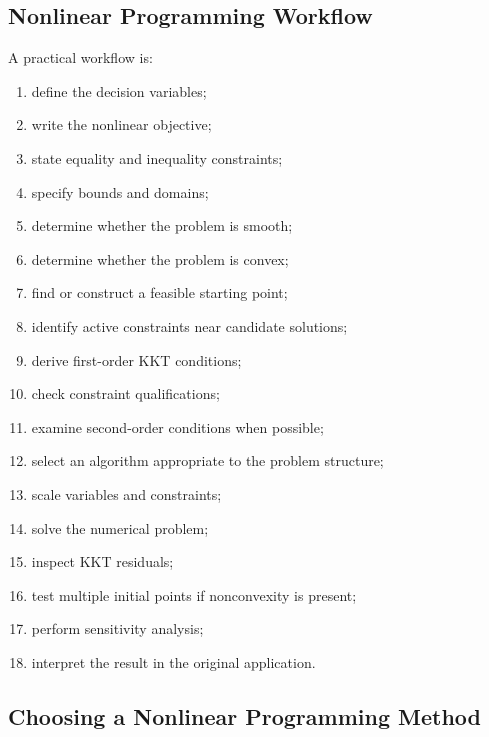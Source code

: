 \subsection{Nonlinear Programming Workflow}
\label{subsec:nlp-workflow}

A practical workflow is:

\begin{enumerate}
    \item define the decision variables;
    \item write the nonlinear objective;
    \item state equality and inequality constraints;
    \item specify bounds and domains;
    \item determine whether the problem is smooth;
    \item determine whether the problem is convex;
    \item find or construct a feasible starting point;
    \item identify active constraints near candidate solutions;
    \item derive first-order KKT conditions;
    \item check constraint qualifications;
    \item examine second-order conditions when possible;
    \item select an algorithm appropriate to the problem structure;
    \item scale variables and constraints;
    \item solve the numerical problem;
    \item inspect KKT residuals;
    \item test multiple initial points if nonconvexity is present;
    \item perform sensitivity analysis;
    \item interpret the result in the original application.
\end{enumerate}

\subsection{Choosing a Nonlinear Programming Method}
\label{subsec:choosing-nlp-method}

